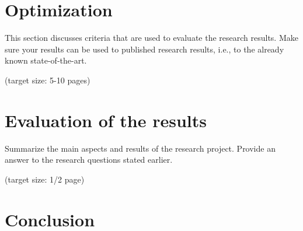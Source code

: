 \documentclass[a4paper,11pt,oneside]{article}
\begin{document}
\section{Optimization}

This section discusses criteria that are used to evaluate the
research results. Make sure your results can be used to published
research results, i.e., to the already known state-of-the-art.

(target size: 5-10 pages)

\section{Evaluation of the results}

Summarize the main aspects and results of the research
project. Provide an answer to the research questions stated earlier.

(target size: 1/2 page)

\section{Conclusion}

\newpage
%
%
\printbibliography
\end{document}
